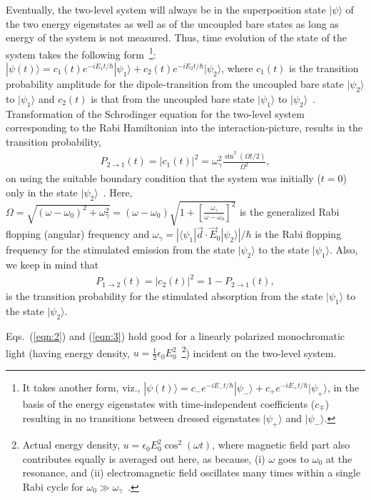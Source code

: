 \documentclass[aps,pra,twocolumn,showpacs,preprintnumbers,amsmath,amssymb,footinbib]{revtex4}
\begin{document}
Eventually, the two-level system will always be in the superposition state $|\psi\rangle$ of the two energy eigenstates as well as of the uncoupled bare states as long as energy of the system is not measured. Thus, time evolution of the state of the system takes the following form~\footnote{It takes another form, viz., $|\psi(t)\rangle=c_-e^{-iE_-t/\hbar}|\psi_-\rangle+c_+e^{-iE_+t/\hbar}|\psi_+\rangle$, in the basis of the energy eigenstates with time-independent coefficients ($c_\mp$) resulting in no transitions between dressed eigenstates $|\psi_+\rangle$ and $|\psi_-\rangle$.}:  $|\psi(t)\rangle=c_{1}(t)e^{-iE_1t/\hbar}|\psi_1\rangle+c_{2}(t)e^{-iE_2t/\hbar}|\psi_2\rangle$, where $c_1(t)$ is the transition probability amplitude for the dipole-transition from the uncoupled bare state $|\psi_2\rangle$ to $|\psi_1\rangle$ and $c_2(t)$ is that from the uncoupled bare state $|\psi_1\rangle$ to $|\psi_2\rangle$~\cite{Dirac,Rabi,Rabi2}. Transformation of the Schrodinger equation for the two-level system corresponding to the Rabi Hamiltonian into the interaction-picture, results in the transition probability,
\begin{eqnarray}\label{eqn:2}
P_{2\rightarrow1}(t)=|c_1(t)|^2=\omega_\gamma^2\frac{\sin^2(\Omega t/2)}{\Omega^2},
\end{eqnarray}
on using the suitable boundary condition that the system was initially ($t=0$) only in the state $|\psi_2\rangle$~\cite{Rabi2,Griffiths,Sakurai}. Here, $\Omega=\sqrt{(\omega-\omega_0)^2+\omega_\gamma^2}=(\omega-\omega_0)\sqrt{1+[\frac{\omega_\gamma}{\omega-\omega_0}]^2}$ is the generalized Rabi flopping (angular) frequency and $\omega_\gamma=|\langle\psi_1|\vec{d}\cdot \vec{E}_0|\psi_2\rangle|/\hbar$ is the Rabi flopping frequency for the stimulated emission from the state $|\psi_2\rangle$ to the state $|\psi_1\rangle$. Also, we keep in mind that
\begin{eqnarray}\label{eqn:3}
P_{1\rightarrow2}(t)=|c_2(t)|^2 =1-P_{2\rightarrow1}(t),
\end{eqnarray}
is the transition probability for the stimulated absorption from the state $|\psi_1\rangle$ to the state $|\psi_2\rangle$.

Eqs.~(\ref{eqn:2}) and (\ref{eqn:3}) hold good for a linearly polarized monochromatic light (having energy density, $u=\frac{1}{2}\epsilon_0E_0^2$~\footnote{Actual energy density, $u=\epsilon_0E_0^2\cos^2(\omega t)$, where magnetic field part also contributes equally is averaged out here, as because, (i) $\omega$ goes to $\omega_0$ at the resonance, and (ii) electromagnetic field oscillates many times within a single Rabi cycle for $\omega_0\gg\omega_\gamma$~\cite{Griffiths}.}) incident on the two-level system. 
\end{document}
